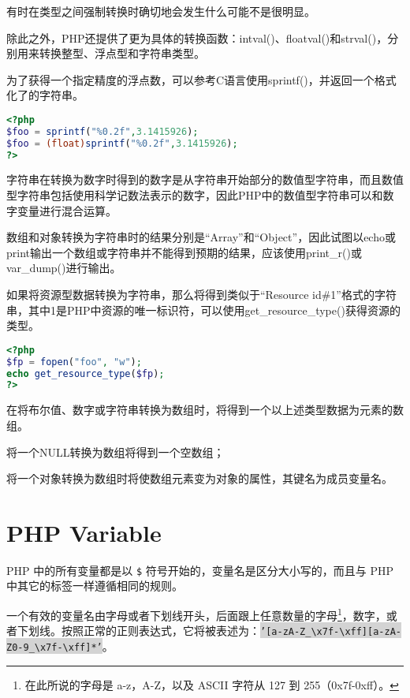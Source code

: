 有时在类型之间强制转换时确切地会发生什么可能不是很明显。

除此之外，PHP还提供了更为具体的转换函数：intval()、floatval()和strval()，分别用来转换整型、浮点型和字符串类型。

为了获得一个指定精度的浮点数，可以参考C语言使用sprintf()，并返回一个格式化了的字符串。

\begin{lstlisting}[language=PHP]
<?php
$foo = sprintf("%0.2f",3.1415926);
$foo = (float)sprintf("%0.2f",3.1415926);
?>
\end{lstlisting}

字符串在转换为数字时得到的数字是从字符串开始部分的数值型字符串，而且数值型字符串包括使用科学记数法表示的数字，因此PHP中的数值型字符串可以和数字变量进行混合运算。


数组和对象转换为字符串时的结果分别是“Array”和“Object”，因此试图以echo或print输出一个数组或字符串并不能得到预期的结果，应该使用print\_r()或var\_dump()进行输出。

如果将资源型数据转换为字符串，那么将得到类似于“Resource id\#1”格式的字符串，其中1是PHP中资源的唯一标识符，可以使用get\_resource\_type()获得资源的类型。

\begin{lstlisting}[language=PHP]
<?php
$fp = fopen("foo", "w");
echo get_resource_type($fp);
?>
\end{lstlisting}

在将布尔值、数字或字符串转换为数组时，将得到一个以上述类型数据为元素的数组。

\begin{compactitem}
\item 将一个NULL转换为数组将得到一个空数组；
\item 将一个对象转换为数组时将使数组元素变为对象的属性，其键名为成员变量名。
\end{compactitem}



\chapter{PHP Variable}






PHP 中的所有变量都是以 \texttt{\$} 符号开始的，变量名是区分大小写的，而且与 PHP 中其它的标签一样遵循相同的规则。

一个有效的变量名由字母或者下划线开头，后面跟上任意数量的字母\footnote{在此所说的字母是 a-z，A-Z，以及 ASCII 字符从 127 到 255（0x7f-0xff）。}，数字，或者下划线。按照正常的正则表达式，它将被表述为：\colorbox{lightgray}{\texttt{'[a-zA-Z\_\textbackslash x7f-\textbackslash xff][a-zA-Z0-9\_\textbackslash x7f-\textbackslash xff]*'}}。

